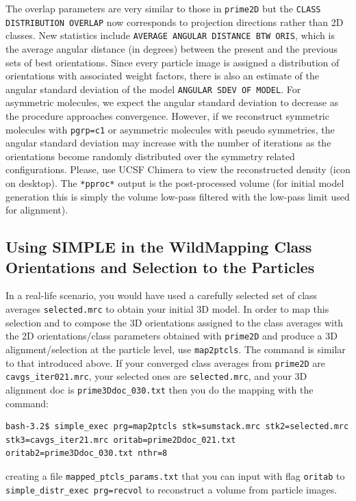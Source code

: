\documentclass[a4paper,11pt]{article}
\newcommand{\prgname}[1]{\textcolor{NavyBlue}{\texttt{#1}}}
\begin{document}
The overlap parameters are very similar to those in \prgname{prime2D} but the \texttt{CLASS DISTRIBUTION OVERLAP} now corresponds to projection directions rather than 2D classes. New statistics include \texttt{AVERAGE ANGULAR DISTANCE BTW ORIS}, which is the average angular distance (in degrees) between the present and the previous sets of best orientations. Since every particle image is assigned a distribution of orientations with associated weight factors, there is also an estimate of the angular standard deviation of the model \texttt{ANGULAR SDEV OF MODEL}. For asymmetric molecules, we expect the angular standard deviation to decrease as the procedure approaches convergence. However, if we reconstruct symmetric molecules with \texttt{pgrp=c1} or asymmetric molecules with pseudo symmetries, the angular standard deviation may increase with the number of iterations as the orientations become randomly  distributed over the symmetry related configurations. Please, use UCSF Chimera to view the reconstructed density (icon on desktop). The \texttt{*pproc*} output is the post-processed volume (for initial model generation this is simply the volume low-pass filtered with the low-pass limit used for alignment).

\begin{tcolorbox}[breakable,colback=white,colframe=orange,width=\dimexpr\textwidth+12mm\relax,enlarge left by=-6mm]
\subsection{Using SIMPLE in the Wild\textemdash{}Mapping Class Orientations and Selection to the Particles}
In a real-life scenario, you would have used a carefully selected set of class averages \texttt{selected.mrc} to obtain your initial 3D model. In order to map this selection and to compose the 3D orientations assigned to the class averages with the 2D orientations/class parameters obtained with \prgname{prime2D} and produce a 3D alignment/selection at the particle level, use \prgname{map2ptcls}. The command is similar to that introduced above. If your converged class averages from \prgname{prime2D} are \texttt{cavgs\_iter021.mrc}, your selected ones are \texttt{selected.mrc}, and your 3D alignment doc is \texttt{prime3Ddoc\_030.txt} then you do the mapping with the command:
\begin{verbatim}
bash-3.2$ simple_exec prg=map2ptcls stk=sumstack.mrc stk2=selected.mrc
stk3=cavgs_iter21.mrc oritab=prime2Ddoc_021.txt oritab2=prime3Ddoc_030.txt nthr=8
\end{verbatim}
creating a file \texttt{mapped\_ptcls\_params.txt} that you can input with flag \texttt{oritab} to \texttt{simple\_distr\_exec prg=recvol} to reconstruct a volume from particle images.
\end{tcolorbox}



\end{document}
